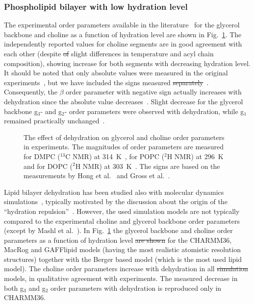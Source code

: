 \documentclass[pre,aps,floatfix,authordate1-4,twocolumn]{revtex4-1}
\providecommand{\DIFadd}[1]{{\protect\color{blue}\uwave{#1}}} %
\providecommand{\DIFdel}[1]{{\protect\color{red}\sout{#1}}}                      %
\providecommand{\DIFaddbegin}{} %
\providecommand{\DIFaddend}{} %
\providecommand{\DIFdelbegin}{} %
\providecommand{\DIFdelend}{} %
\begin{document}
\subsubsection{Phospholipid bilayer with low hydration level}
The experimental order parameters available in the literature~\cite{dvinskikh05b,ulrich94,bechinger91} 
for the glycerol backbone and choline as a function of hydration level are shown in Fig.~\ref{ordPhydr}. 
The independently reported values for choline segments are in good agreement with each other (despite 
\DIFdelbegin \DIFdel{of 
}\DIFdelend slight differences in temperature and acyl chain composition),
showing increase for both segments with decreasing hydration level. It should be noted that only 
absolute values were measured in the original experiments~\cite{dvinskikh05b,ulrich94,bechinger91}, but
we have included the signs measured \DIFdelbegin \DIFdel{separately}\DIFdelend \DIFaddbegin \DIFadd{in separate studies}\DIFaddend ~\cite{hong95a,hong95b,gross97}. 
Consequently, the $\beta$ order parameter with negative sign actually increases with dehydration 
since the absolute value decreases~\cite{dvinskikh05b,ulrich94,bechinger91}.
Slight decrease for the glycerol backbone g$_3$- and g$_2$- order parameters were observed with dehydration, 
while g$_1$ remained practically unchanged~\cite{dvinskikh05b}.
\begin{figure}[]
  \centering
  \caption{\label{ordPhydr}
    The effect of dehydration on glycerol and choline order parameters in experiments.
    The magnitudes of order parameters are measured for DMPC ($^{13}$C NMR) at 314~K~\cite{dvinskikh05b}, 
    for POPC ($^2$H NMR) at 296~K~\cite{bechinger91} and for DOPC ($^2$H NMR) at 303~K~\cite{ulrich94}. 
    The signs are based on the measurements by Hong et al.~\cite{hong95a,hong95b} 
    and Gross et al.~\cite{gross97}.
  }
\end{figure}

Lipid bilayer dehydration has been studied also with molecular dynamics simulations~\cite{mashl01,pertsin05,pertsin07,eun09,eun10,schneck12},
typically motivated by the  discussion about the origin of the ``hydration repulsion''~\cite{israelachvili,israelachvili96,sparr11}.
However, the used simulation models are not typically compared to the experimental choline and glycerol backbone
order parameters (except by Mashl et al.~\cite{mashl01}).
In Fig.~\ref{ordPhydr} the glycerol backbone and choline order parameters \DIFaddbegin \DIFadd{are shown }\DIFaddend as a function of hydration level \DIFdelbegin \DIFdel{are shown 
}\DIFdelend for the CHARMM36, MacRog and GAFFlipid models (having the most realistic atomistic resolution structures) together with the Berger based model 
(which is the most used lipid model). The choline order parameters increase with dehydration in all
\DIFdelbegin \DIFdel{simulation
}\DIFdelend models, in qualitative agreement with experiments. 
The measured decrease in both g$_3$ and g$_2$ order parameters with dehydration is reproduced only in CHARMM36.
\end{document}
